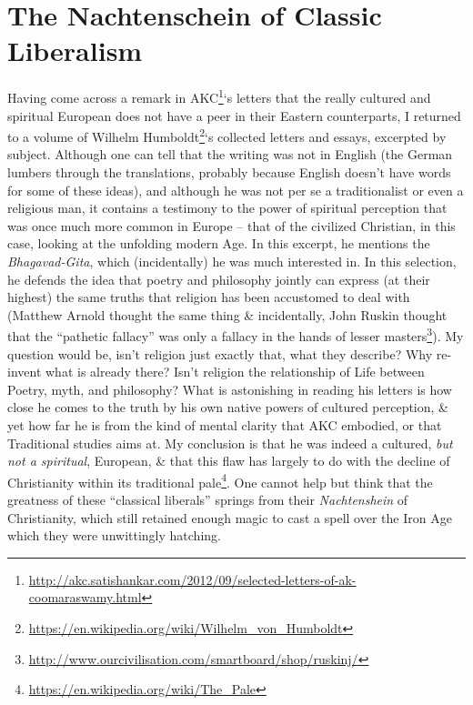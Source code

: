 \section{The Nachtenschein of Classic Liberalism}

Having come across a remark in AKC\footnote{\url{http://akc.satishankar.com/2012/09/selected-letters-of-ak-coomaraswamy.html}}`s letters that the really cultured and spiritual European does not have a peer in their Eastern counterparts, I returned to a volume of Wilhelm Humboldt\footnote{\url{https://en.wikipedia.org/wiki/Wilhelm\_von\_Humboldt}}`s collected letters and essays, excerpted by subject. Although one can tell that the writing was not in English (the German lumbers through the translations, probably because English doesn't have words for some of these ideas), and although he was not per se a traditionalist or even a religious man, it contains a testimony to the power of spiritual perception that was once much more common in Europe -- that of the civilized Christian, in this case, looking at the unfolding modern Age. In this excerpt, he mentions the \emph{Bhagavad-Gita}, which (incidentally) he was much interested in. In this selection, he defends the idea that poetry and philosophy jointly can express (at their highest) the same truths that religion has been accustomed to deal with (Matthew Arnold thought the same thing \& incidentally, John Ruskin thought that the ``pathetic fallacy'' was only a fallacy in the hands of lesser masters\footnote{\url{http://www.ourcivilisation.com/smartboard/shop/ruskinj/}}). My question would be, isn't religion just exactly that, what they describe? Why re-invent what is already there? Isn't religion the relationship of Life between Poetry, myth, and philosophy? What is astonishing in reading his letters is how close he comes to the truth by his own native powers of cultured perception, \& yet how far he is from the kind of mental clarity that AKC embodied, or that Traditional studies aims at. My conclusion is that he was indeed a cultured, \emph{but not a spiritual}, European, \& that this flaw has largely to do with the decline of Christianity within its traditional pale\footnote{\url{https://en.wikipedia.org/wiki/The\_Pale}}. One cannot help but think that the greatness of these ``classical liberals'' springs from their \emph{Nachtenshein} of Christianity, which still retained enough magic to cast a spell over the Iron Age which they were unwittingly hatching.

